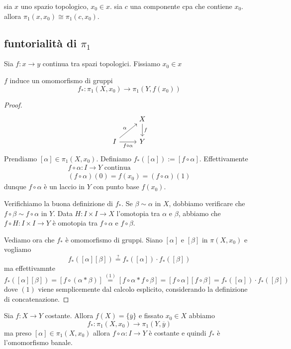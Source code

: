 \begin{remark}
    sia \(x\) uno spazio topologico, \(x_{0} \in x\). sia \(c\) una componente
    cpa che contiene \(x_{0}\). allora \(\pi_{1}{(x, x_{0})} \cong \pi_{1}{(c,
    x_{0})}\). 
\end{remark}

\subsection{funtorialità di \(\pi_{1}\)}
    Sia \(f : x \to y\) continua tra spazi topologici. Fissiamo \(x_{0} \in x\)
    \begin{theorem}
        \(f\) induce un omomorfismo di gruppi
        \[
          f_{*} : \pi_{1}{(X, x_{0})} \to \pi_{1}{(Y, f{(x_{0})})}
        \]
    \end{theorem}
    
    \begin{proof}
    \[\begin{tikzcd}
        & X \\
        I & Y
        \arrow["f", from=1-2, to=2-2]
        \arrow["\alpha", from=2-1, to=1-2]
        \arrow["{f \circ \alpha}"', from=2-1, to=2-2]
    \end{tikzcd}\]
    Prendiamo \([\alpha] \in \pi_{1}{(X, x_{0})}\). Definiamo \(f_*{([\alpha])}
    := [f \circ \alpha]\). Effettivamente
    \begin{align*}
      f \circ \alpha : I \to Y \text{ continua } \\
      {(f \circ \alpha)}{(0)} = f{(x_{0})} = {(f \circ \alpha)}{(1)}
    \end{align*}
    dunque \(f \circ \alpha\) è un laccio in \(Y\) con punto base
    \(f{(x_{0})}\). 

    Verifichiamo la buona definizione di \(f_*\). Se \(\beta \sim \alpha\) in
    \(X\), dobbiamo verificare che \(f \circ \beta \sim f \circ \alpha\) in
    \(Y\). Data \(H : I \times I \to X\) l'omotopia tra \(\alpha\) e \(\beta\),
    abbiamo che \(f \circ H : I \times I \to Y\) è omotopia tra \(f \circ
    \alpha\) e \(f\circ \beta\).

    Vediamo ora che \(f_*\) è omomorfismo di gruppi. Siano \([\alpha]\) e
    \([\beta]\) in \(\pi{(X, x_{0})}\) e vogliamo
    \[
      f_*{([\alpha][\beta])} \overset{?}{=} f_*{([\alpha])} \cdot  f_*{([\beta])}
    \]
    ma effettivamnte
    \[
        f_*{([\alpha][\beta])} = [f \circ (\alpha * \beta)] \overset{(1)}{=} [f \circ \alpha *
        f \circ \beta] = [f \circ \alpha] [f \circ \beta] = f_*{([\alpha])} \cdot 
        f_*{([\beta])}
    \]
    dove \({(1)}\) viene semplicemente dal calcolo esplicito, considerando la
    definizione di concatenazione.
    \end{proof}
    \begin{example}
        Sia \(f : X \to Y\) costante. Allora \(f{(X)} = \{\overline{y}\} \) e
        fissato \(x_{0} \in X\) abbiamo 
        \[
          f_* : \pi_{1}{(X, x_{0})} \to \pi_{1}{(Y, \overline{y})}
        \]
        ma preso \([\alpha] \in \pi_{1}{(X, x_{0})}\) allora \(f \circ \alpha :
        I \to Y \) è costante e quindi \(f_*\) è l'omomorfismo banale.
    \end{example}
    
